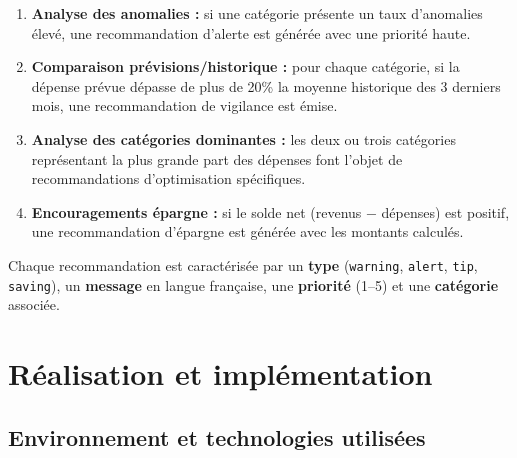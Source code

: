 \documentclass[12pt,a4paper]{report}
\begin{document}
\begin{enumerate}
  \item \textbf{Analyse des anomalies :} si une catégorie présente un taux
    d'anomalies élevé, une recommandation d'alerte est générée avec une
    priorité haute.

  \item \textbf{Comparaison prévisions/historique :} pour chaque catégorie,
    si la dépense prévue dépasse de plus de 20\% la moyenne historique des
    3 derniers mois, une recommandation de vigilance est émise.

  \item \textbf{Analyse des catégories dominantes :} les deux ou trois
    catégories représentant la plus grande part des dépenses font l'objet
    de recommandations d'optimisation spécifiques.

  \item \textbf{Encouragements épargne :} si le solde net (revenus − dépenses)
    est positif, une recommandation d'épargne est générée avec les montants
    calculés.
\end{enumerate}

Chaque recommandation est caractérisée par un \textbf{type}
(\texttt{warning}, \texttt{alert}, \texttt{tip}, \texttt{saving}),
un \textbf{message} en langue française, une \textbf{priorité} (1--5) et
une \textbf{catégorie} associée.

\chapter{Réalisation et implémentation}

\section{Environnement et technologies utilisées}
\end{document}
